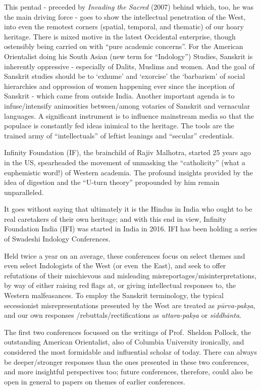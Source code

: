This pentad - preceded by {\sl Invading the Sacred} (2007) behind which, too, he was the main driving force - goes to show the intellectual penetration of the West, into even the remotest corners (spatial, temporal, and thematic) of our hoary heritage. There is mixed motive in the latest Occidental enterprise, though ostensibly being carried on with “pure academic concerns”. For the American Orientalist doing his South Asian (new term for “Indology”) Studies, Sanskrit is inherently oppressive - especially of Dalits, Muslims and women. And the goal of Sanskrit studies should be to ‘exhume’ and ‘exorcise’ the ‘barbarism’ of social hierarchies and oppression of women happening ever since the inception of Sanskrit - which came from outside India. Another important agenda is to infuse/intensify animosities between/among votaries of Sanskrit and vernacular languages. A significant instrument is to influence mainstream media so that the populace is constantly fed ideas inimical to the heritage. The tools are the trained army of “intellectuals” of leftist leanings and “secular” credentials.
\vskip 1.5pt

Infinity Foundation (IF), the brainchild of Rajiv Malhotra, started 25 years ago in the US, spearheaded the movement of unmasking the “catholicity” (what a euphemistic word!) of Western academia. The profound insights provided by the idea of digestion and the “U-turn theory” propounded by him remain unparalleled.
\vskip 1.5pt

It goes without saying that ultimately it is the Hindus in India who ought to be real caretakers of their own heritage; and with this end in view, Infinity Foundation India (IFI) was started in India in 2016. IFI has been holding a series of Swadeshi Indology Conferences. 
\vskip 1.5pt

Held twice a year on an average, these conferences focus on select themes and even select Indologists of the West (or even~the East), and seek to offer refutations of their mischievous  and misleading misreportages/misinterpretations, by way of either raising red flags at, or giving intellectual responses to, the Western malfeasances. To employ the Sanskrit terminology, the typical secessionist misrepresentations presented by the West are treated as {\sl pūrva-pakṣa}, and our own responses /rebuttals/rectifications as {\sl uttara-pakṣa} or {\sl siddhānta}. 

The first two conferences focussed on the writings of Prof.\ Sheldon Pollock, the outstanding American Orientalist, also of Columbia University ironically, and considered the most formidable and influential scholar of today. There can always be deeper/stronger responses than the ones presented in these two conferences, and more insightful perspectives too; future conferences, therefore, could also be open in general to papers on themes of earlier conferences.
\bigskip

